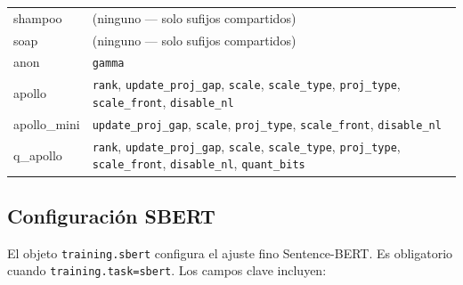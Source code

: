 \begin{longtable}{>{\ttfamily\footnotesize\raggedright\arraybackslash}p{5.2cm}>{\raggedright\arraybackslash}p{9.7cm}}
shampoo & (ninguno --- solo sufijos compartidos) \\
soap & (ninguno --- solo sufijos compartidos) \\
anon & \texttt{gamma} \\
apollo & \texttt{rank}, \texttt{update\_proj\_gap}, \texttt{scale}, \texttt{scale\_type}, \texttt{proj\_type}, \texttt{scale\_front}, \texttt{disable\_nl} \\
apollo\_mini & \texttt{update\_proj\_gap}, \texttt{scale}, \texttt{proj\_type}, \texttt{scale\_front}, \texttt{disable\_nl} \\
q\_apollo & \texttt{rank}, \texttt{update\_proj\_gap}, \texttt{scale}, \texttt{scale\_type}, \texttt{proj\_type}, \texttt{scale\_front}, \texttt{disable\_nl}, \texttt{quant\_bits} \\
\end{longtable}

\subsection{Configuración SBERT}
\label{subsec:sbert-config}

El objeto \texttt{training.sbert} configura el ajuste fino Sentence-BERT. Es obligatorio cuando \texttt{training.task=sbert}. Los campos clave incluyen:

